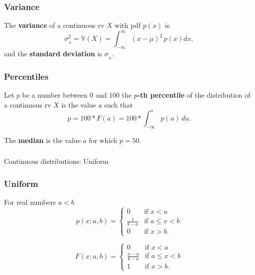 \begin{frame}[fragile]\frametitle{Variance}

\begin{defn}
The {\bf variance} of a continuous rv $X$ with
pdf $p(x)$ is
$$\sigma^2_{_X} = \mathbb V(X) = \int_{-\infty}^{\infty} (x - \mu)^2\, p(x) dx,$$
and the {\bf standard deviation} is $\sigma_{_X}$. 
\end{defn}

\end{frame}


\begin{frame}[fragile]\frametitle{Percentiles}

\begin{defn}
Let $p$ be a number between $0$ and $100$ the {\bf $p$-th percentile}
of the distribution of a continuous rv $X$ is the value $a$
such that 
$$p = 100*F(a) = 100*\int_{-\infty}^{a} p(u) \, du.$$

The {\bf median} is the value $a$ for which $p=50$.
\end{defn}

\end{frame}


\begin{frame}[fragile]\frametitle{}
\begin{center}
{\Large Continuous distributions: Uniform }

\end{center}
\end{frame}



\begin{frame}[fragile]\frametitle{Uniform}

For real numbers $a < b$
$$p(x;a,b) = \left\{\begin{array}{ll}
			0 & \mbox{if } x  < a \\
			\frac{1}{b-a} & \mbox{if } a \leq x < b \\
			0 & \mbox{if } x > b 
				   .	\end{array} \right
						. $$ 
\vspace{.1in}

$$F(x;a,b) = \left\{\begin{array}{ll}
			0 & \mbox{if } x  < a \\
			\frac{x-a}{b-a} & \mbox{if } a \leq x < b \\
			1 & \mbox{if } x > b 
				   .	\end{array} \right
						. $$ 



\end{frame}



